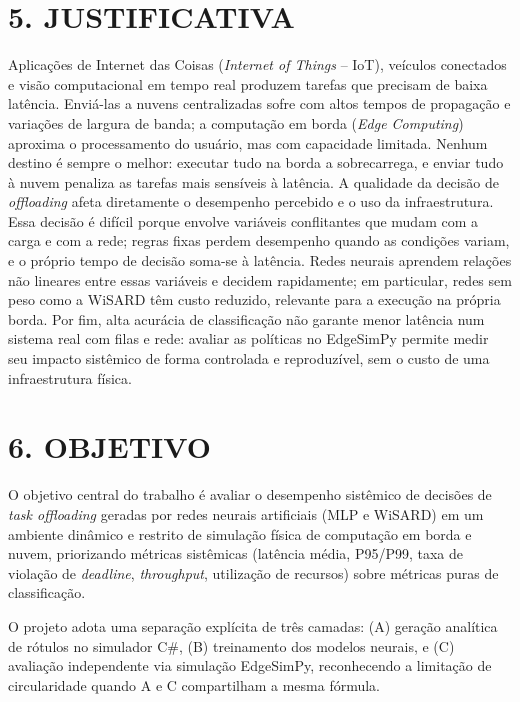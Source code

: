 \documentclass[12pt,a4paper]{article}
\begin{document}
\section*{\bfseries 5. JUSTIFICATIVA}
Aplicações de Internet das Coisas (\textit{Internet of Things} -- IoT), veículos conectados e
visão computacional em tempo real produzem tarefas que precisam de baixa latência. Enviá-las a
nuvens centralizadas sofre com altos tempos de propagação e variações de largura de banda; a
computação em borda (\textit{Edge Computing}) aproxima o processamento do usuário, mas com
capacidade limitada. Nenhum destino é sempre o melhor: executar tudo na borda a sobrecarrega, e
enviar tudo à nuvem penaliza as tarefas mais sensíveis à latência. A qualidade da decisão de
\textit{offloading} afeta diretamente o desempenho percebido e o uso da infraestrutura.\\

Essa decisão é difícil porque envolve variáveis conflitantes que mudam com a carga e com a
rede; regras fixas perdem desempenho quando as condições variam, e o próprio tempo de decisão
soma-se à latência. Redes neurais aprendem relações não lineares entre essas variáveis e decidem
rapidamente; em particular, redes sem peso como a WiSARD têm custo reduzido, relevante para a
execução na própria borda. Por fim, alta acurácia de classificação não garante menor latência
num sistema real com filas e rede: avaliar as políticas no EdgeSimPy
\cite{souza2023edgesimpy} permite medir seu impacto sistêmico de forma controlada e
reproduzível, sem o custo de uma infraestrutura física.


\section*{\bfseries 6. OBJETIVO}
O objetivo central do trabalho é avaliar o desempenho sistêmico de decisões de \textit{task
offloading} geradas por redes neurais artificiais (MLP e WiSARD) em um ambiente dinâmico e
restrito de simulação física de computação em borda e nuvem, priorizando métricas sistêmicas
(latência média, P95/P99, taxa de violação de \textit{deadline}, \textit{throughput}, utilização de recursos) sobre
métricas puras de classificação.

O projeto adota uma separação explícita de três camadas: (A) geração analítica de rótulos no
simulador C\#, (B) treinamento dos modelos neurais, e (C) avaliação independente via simulação
EdgeSimPy, reconhecendo a limitação de circularidade quando A e C compartilham a mesma fórmula.
\end{document}
